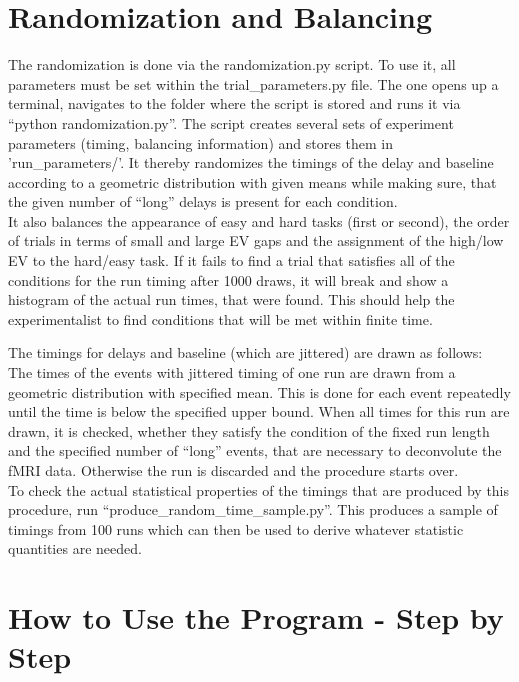 \section{Randomization and Balancing}
The randomization is done via the randomization.py script. To use it, all parameters must be set within the trial\_parameters.py file. The one opens up a terminal, navigates to the folder where the script is stored and runs it via ``python randomization.py''.
The script creates several sets of experiment parameters (timing, balancing information) and stores them in 'run\_parameters/'. It thereby randomizes the timings of the delay and baseline according to a geometric distribution with given means while making sure, that the given number of ``long'' delays is present for each condition.\\
It also balances the appearance of easy and hard tasks (first or second), the order of trials in terms of small and large EV gaps and the assignment of the high/low EV to the hard/easy task.
If it fails to find a trial that satisfies all of the conditions for the run timing after 1000 draws, it will break and show a histogram of the actual run times, that were found. This should help the experimentalist to find conditions that will be met within finite time.
\par
The timings for delays and baseline (which are jittered) are drawn as follows: \\
The times of the events with jittered timing of one run are drawn from a geometric distribution with specified mean.
This is done for each event repeatedly until the time is below the specified upper bound. When all times for this run are drawn, it is checked, whether they satisfy the condition of the fixed run length and the specified number of ``long'' events, that are necessary to deconvolute the fMRI data. Otherwise the run is discarded and the procedure starts over. \\
To check the actual statistical properties of the timings that are produced by this procedure, run ``produce\_random\_time\_sample.py''. This produces a sample of timings from 100 runs which can then be used to derive whatever statistic quantities are needed.
\section{How to Use the Program - Step by Step}

